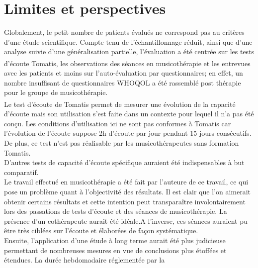 


\section{Limites et perspectives}
Globalement, le petit nombre de patients évalués ne correspond pas au critères d'une étude scientifique. 
Compte tenu  de l'échantillonnage réduit, ainsi que d'une analyse
suivie d'une généralisation partielle, l'évaluation a été centrée sur les
tests d'écoute Tomatis\textsuperscript \textregistered , les observations des séances en musicothérapie 
et les entrevues avec les patients  et moins sur
l'auto-évaluation par questionnaires; en effet, un nombre insuffisant de questionnaires WHOQOL  a été 
rassemblé post thérapie pour le groupe de musicothérapie.
\\
Le test d'écoute de Tomatis\textsuperscript \textregistered 
permet de mesurer une évolution de la capacité d'écoute mais son 
utilisation s'est faite dans un contexte pour lequel il n'a pas été conçu. Les conditions d'utilisation ici ne 
sont pas conformes à Tomatis car l'évolution de l'écoute suppose 2h d'écoute par jour pendant 15 jours 
consécutifs. 
De plus, ce test n'est pas réalisable par les 
musicothérapeutes sans formation Tomatis.
\\
 	D'autres tests de capacité d'écoute spécifique 
auraient été indispensables à but
comparatif.
\\
Le travail effectué en musicothérapie a été fait par l'auteure de ce travail, ce qui pose un problème quant 
à l'objectivité des résultats. Il est clair que l'on aimerait obtenir certains résultats et cette intention peut 
transparaître involontairement  lors des passations de tests d'écoute et des séances de musicothérapie. 
La présence d'un cothérapeute aurait été idéale.A l'inverse, ces séances  auraient pu être très ciblées sur 
l'écoute et élaborées de façon systématique.
\\
Ensuite, l'application d'une étude à long terme aurait été plus judicieuse permettant de nombreuses
mesures en vue de conclusions plus étoffées et étendues.  La durée hebdomadaire réglementée par la 
